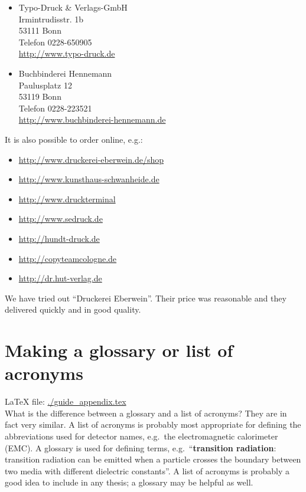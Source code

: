 \begin{itemize}
\item
Typo-Druck \& Verlags-GmbH\\
Irmintrudisstr. 1b\\
53111 Bonn\\
Telefon 0228-650905\\
\url{http://www.typo-druck.de}

\item
Buchbinderei Hennemann\\
Paulusplatz 12\\
53119 Bonn\\
Telefon 0228-223521\\
\url{http://www.buchbinderei-hennemann.de}

\end{itemize}

It is also possible to order online, e.g.:
\begin{itemize}
\item \url{http://www.druckerei-eberwein.de/shop}
\item \url{http://www.kunsthaus-schwanheide.de}
\item \url{http://www.druckterminal}
\item \url{http://www.sedruck.de}
\item \url{http://hundt-druck.de}
\item \url{http://copyteamcologne.de}
\item \url{http://dr.hut-verlag.de}
\end{itemize}
We have tried out \foreignquote{ngerman}{Druckerei Eberwein}. Their
price was reasonable and they delivered quickly and in good quality.


\chapter{Making a glossary or list of acronyms}
\label{sec:app:glossary}

\LaTeX{} file: \url{./guide_appendix.tex}\\[1ex]
\noindent
What is the difference between a glossary and a list of acronyms? They
are in fact very similar. A list of acronyms is probably most
appropriate for defining the abbreviations used for detector names,
e.g.\ the electromagnetic calorimeter (EMC). A glossary is used for
defining terms, e.g.\ \enquote{\textbf{transition radiation}: transition
radiation can be emitted when a particle crosses the boundary between
two media with different dielectric constants}. A list of acronyms is
probably a good idea to include in any thesis; a glossary may be
helpful as well.

